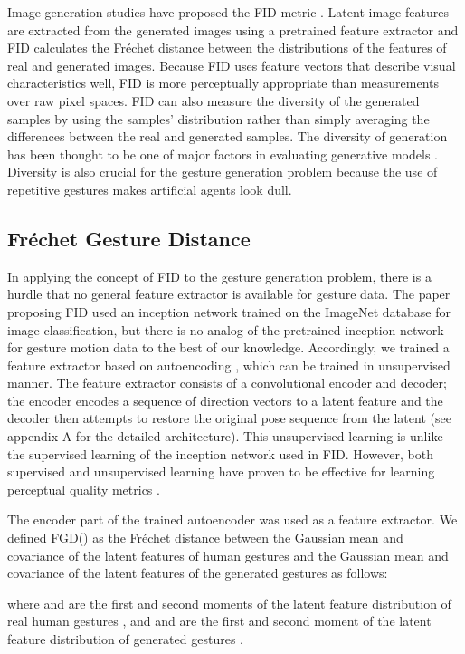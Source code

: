 \documentclass[acmtog]{acmart}
\begin{document}
Image generation studies have proposed the FID metric \cite{heusel2017gans}. Latent image features are extracted from the generated images using a pretrained feature extractor and FID calculates the Fr\'{e}chet distance between the distributions of the features of real and generated images. Because FID uses feature vectors that describe visual characteristics well, FID is more perceptually appropriate than measurements over raw pixel spaces. FID can also measure the diversity of the generated samples by using the samples’ distribution rather than simply averaging the differences between the real and generated samples. The diversity of generation has been thought to be one of major factors in evaluating generative models \cite{borji2019pros}. Diversity is also crucial for the gesture generation problem because the use of repetitive gestures makes artificial agents look dull.

\subsection{Fr\'{e}chet Gesture Distance}
In applying the concept of FID to the gesture generation problem, there is a hurdle that no general feature extractor is available for gesture data. The paper proposing FID used an inception network trained on the ImageNet database for image classification, but there is no analog of the pretrained inception network for gesture motion data to the best of our knowledge. Accordingly, we trained a feature extractor based on autoencoding \cite{rumelhart1985learning}, which can be trained in unsupervised manner. The feature extractor consists of a convolutional encoder and decoder; the encoder encodes a sequence of direction vectors  to a latent feature  and the decoder then attempts to restore the original pose sequence from the latent  (see appendix A for the detailed architecture). This unsupervised learning is unlike the supervised learning of the inception network used in FID. However, both supervised and unsupervised learning have proven to be effective for learning perceptual quality metrics \cite{zhang2018unreasonable}. 

The encoder part of the trained autoencoder was used as a feature extractor. We defined FGD() as the Fr\'{e}chet distance between the Gaussian mean and covariance of the latent features of human gestures  and the Gaussian mean and covariance of the latent features of the generated gestures  as follows:



\noindent where  and  are the first and second moments of the latent feature distribution  of real human gestures , and  and  are the first and second moment of the latent feature distribution  of generated gestures .
\end{document}
